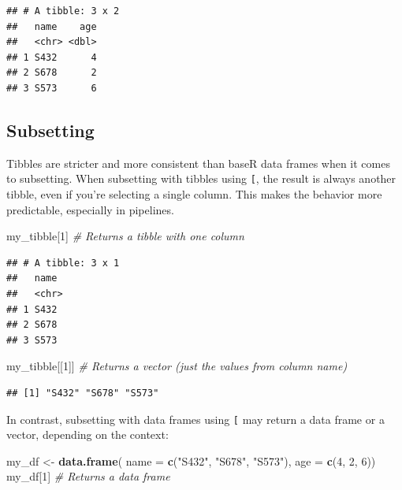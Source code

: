\documentclass[
]{book}
\newenvironment{Shaded}{\begin{snugshade}}{\end{snugshade}}
\newcommand{\AttributeTok}[1]{\textcolor[rgb]{0.13,0.29,0.53}{#1}}
\newcommand{\CommentTok}[1]{\textcolor[rgb]{0.56,0.35,0.01}{\textit{#1}}}
\newcommand{\DecValTok}[1]{\textcolor[rgb]{0.00,0.00,0.81}{#1}}
\newcommand{\FunctionTok}[1]{\textcolor[rgb]{0.13,0.29,0.53}{\textbf{#1}}}
\newcommand{\NormalTok}[1]{#1}
\newcommand{\OtherTok}[1]{\textcolor[rgb]{0.56,0.35,0.01}{#1}}
\newcommand{\StringTok}[1]{\textcolor[rgb]{0.31,0.60,0.02}{#1}}
\begin{document}
\begin{verbatim}
## # A tibble: 3 x 2
##   name    age
##   <chr> <dbl>
## 1 S432      4
## 2 S678      2
## 3 S573      6
\end{verbatim}

\subsection{Subsetting}\label{subsetting}

Tibbles are stricter and more consistent than baseR data frames when it comes to subsetting. When subsetting with tibbles using \texttt{{[}}, the result is always another tibble, even if you're selecting a single column. This makes the behavior more predictable, especially in pipelines.

\begin{Shaded}
\begin{Highlighting}[]
\NormalTok{my\_tibble[}\DecValTok{1}\NormalTok{]      }\CommentTok{\# Returns a tibble with one column}
\end{Highlighting}
\end{Shaded}

\begin{verbatim}
## # A tibble: 3 x 1
##   name 
##   <chr>
## 1 S432 
## 2 S678 
## 3 S573
\end{verbatim}

\begin{Shaded}
\begin{Highlighting}[]
\NormalTok{my\_tibble[[}\DecValTok{1}\NormalTok{]]    }\CommentTok{\# Returns a vector (just the values from column name)}
\end{Highlighting}
\end{Shaded}

\begin{verbatim}
## [1] "S432" "S678" "S573"
\end{verbatim}

In contrast, subsetting with data frames using \texttt{{[}} may return a data frame or a vector, depending on the context:

\begin{Shaded}
\begin{Highlighting}[]
\NormalTok{my\_df }\OtherTok{\textless{}{-}} \FunctionTok{data.frame}\NormalTok{(}
  \AttributeTok{name =} \FunctionTok{c}\NormalTok{(}\StringTok{"S432"}\NormalTok{, }\StringTok{"S678"}\NormalTok{, }\StringTok{"S573"}\NormalTok{),}
  \AttributeTok{age =} \FunctionTok{c}\NormalTok{(}\DecValTok{4}\NormalTok{, }\DecValTok{2}\NormalTok{, }\DecValTok{6}\NormalTok{))}
\NormalTok{my\_df[}\DecValTok{1}\NormalTok{]      }\CommentTok{\# Returns a data frame}
\end{Highlighting}
\end{Shaded}
\end{document}
